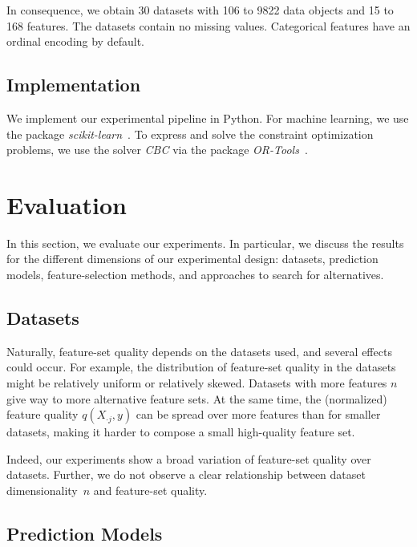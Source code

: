 \documentclass{article}
\theoremstyle{definition}
\begin{document}
In consequence, we obtain 30 datasets with 106 to 9822 data objects and 15 to 168 features.
The datasets contain no missing values.
Categorical features have an ordinal encoding by default.

\subsection{Implementation}
\label{sec:experimental-design:implementation}

We implement our experimental pipeline in Python.
For machine learning, we use the package \emph{scikit-learn}~\cite{pedregosa2011scikit-learn}.
To express and solve the constraint optimization problems, we use the solver \emph{CBC} via the package \emph{OR-Tools}~\cite{perron2022or-tools}.

\section{Evaluation}
\label{sec:evaluation}

In this section, we evaluate our experiments.
In particular, we discuss the results for the different dimensions of our experimental design:
datasets, prediction models, feature-selection methods, and approaches to search for alternatives.

\subsection{Datasets}

Naturally, feature-set quality depends on the datasets used, and several effects could occur.
For example, the distribution of feature-set quality in the datasets might be relatively uniform or relatively skewed.
Datasets with more features $n$ give way to more alternative feature sets.
At the same time, the (normalized) feature quality $q(X_{\cdot{}j},y)$ can be spread over more features than for smaller datasets, making it harder to compose a small high-quality feature set.

Indeed, our experiments show a broad variation of feature-set quality over datasets.
Further, we do not observe a clear relationship between dataset dimensionality~$n$ and feature-set quality.

\subsection{Prediction Models}
\end{document}

